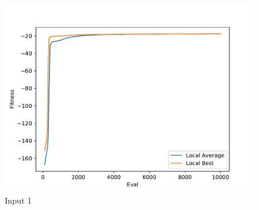 \documentclass{standalone}
\begin{document}
\begin{figure}[!htb]
	\caption{Input 1}
	\label{fig:graph_1074}
	\includegraphics[width=\textwidth]{../graphs/graphs/1074.pdf}
\end{figure}
\end{document}
